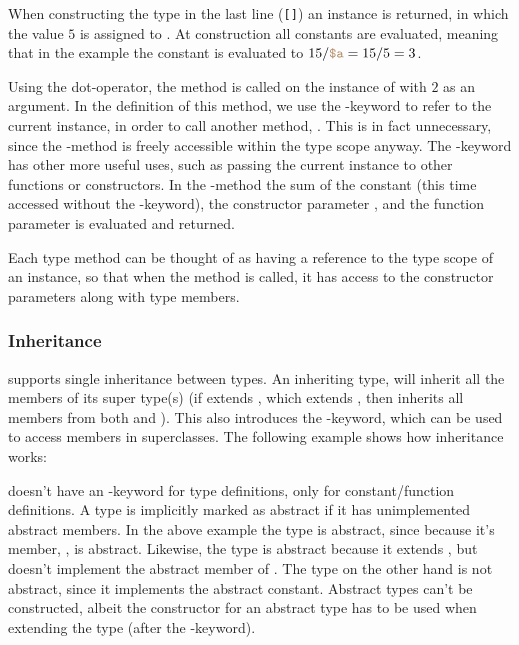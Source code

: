 When constructing the type in the last line (\texttt{[]})
an instance is returned, in which the value $5$ is assigned to .
At construction all constants are evaluated, meaning that in the example
the constant  is evaluated to $15 / \variable{a} = 15 / 5 = 3$.

Using the dot-operator, the method  is called on the instance of
 with $2$ as an argument. In the definition of this method, we use the
-keyword to refer to the current instance, in order to call another
method, . This is in fact unnecessary, since the
-method is freely accessible within the type scope anyway. The
-keyword has other more useful uses, such as passing the current
instance to other functions or constructors. In the -method
the sum of the constant  (this time accessed without the
-keyword), the constructor parameter , and the function
parameter  is evaluated and returned.

Each type method can be thought of as having a reference to the type scope of an
instance, so that when the method is called, it has access to the constructor 
parameters along with type members.

\subsubsection{Inheritance}

\productname{} supports single inheritance between types. An inheriting type, will
inherit all the members of its super type(s) (if  extends , which
extends , then  inherits all members from both  and ).
This also introduces the -keyword, which can be used to access members
in superclasses. The following example shows how inheritance works:


\productname{} doesn't have an -keyword for type definitions, only
for constant/function definitions. A type is implicitly marked as abstract if it has
unimplemented abstract members. In the above example the type  is abstract,
since because it's member, , is abstract. Likewise, the type
 is abstract because it extends , but doesn't implement the abstract
member of . The type  on the other hand is not abstract, since it
implements the abstract constant. Abstract types can't be constructed, albeit the
constructor for an abstract type has to be used when extending the type (after the
-keyword).

